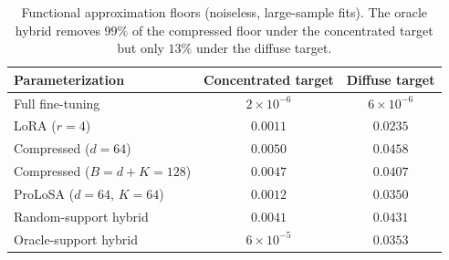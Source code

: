 \begin{table}[htbp]
\centering
\small
\begin{tabular}{lcc}
\toprule
Parameterization & Concentrated target & Diffuse target \\
\midrule
Full fine-tuning & $2\times10^{-6}$ & $6\times10^{-6}$ \\
LoRA ($r=4$) & $0.0011$ & $0.0235$ \\
Compressed ($d=64$) & $0.0050$ & $0.0458$ \\
Compressed ($B=d+K=128$) & $0.0047$ & $0.0407$ \\
ProLoSA ($d=64$, $K=64$) & $0.0012$ & $0.0350$ \\
Random-support hybrid & $0.0041$ & $0.0431$ \\
Oracle-support hybrid & $6\times10^{-5}$ & $0.0353$ \\
\bottomrule
\end{tabular}
\caption{Functional approximation floors (noiseless, large-sample fits). The oracle hybrid removes $99\%$ of the compressed floor under the concentrated target but only $13\%$ under the diffuse target.}
\label{tab:transformer_floors}
\end{table}

